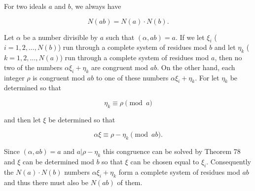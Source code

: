 For two ideals $a$ and $b$, we always have

$$N(a b) = N(a) \cdot N(b).$$

Let $\alpha$ be a number divisible by $a$ such that $(\alpha, a b) = a$. If we let $\xi_i$ ($i = 1, 2, \ldots, N(b)$) run through a complete system of residues mod $b$ and let $\eta_k$ ($k = 1, 2, \ldots, N(a)$) run through a complete system of residues mod $a$, then no two of the numbers $\alpha \xi_i + \eta_k$ are congruent mod $a b$. On the other hand, each integer $\rho$ is congruent mod $a b$ to one of these numbers $\alpha \xi_i + \eta_k$. For let $\eta_k$ be determined so that

$$\eta_k \equiv \rho \pmod{a}$$

and then let $\xi$ be determined so that

$$\alpha \xi \equiv \rho - \eta_k \pmod{a b}.$$

Since $(\alpha, a b) = a$ and $a | \rho - \eta_k$ this congruence can be solved by Theorem 78 and $\xi$ can be determined mod $b$ so that $\xi$ can be chosen equal to $\xi_i$. Consequently the $N(a) \cdot N(b)$ numbers $\alpha \xi_i + \eta_k$ form a complete system of residues mod $a b$ and thus there must also be $N(a b)$ of them.
